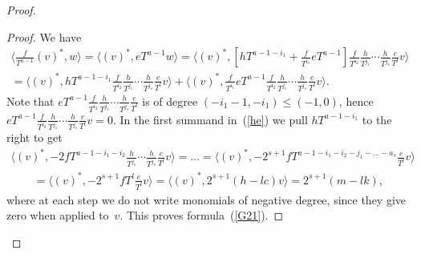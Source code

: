 \documentclass[pdftex]{sigma}
\numberwithin{equation}{section}
\begin{document}
\begin{proof}
\begin{proof}We have
\begin{gather}
\bigg\langle \frac{f}{T^{a-1}} (v)^*, w \bigg\rangle = \big\langle (v)^*, eT^{a-1} w \big\rangle = \bigg\langle (v)^*, \left[ hT^{a-1-i_1} +
\frac{f}{T^{i_1}} eT^{a-1} \right]
 \frac{f}{T^{i_2}}\frac{h}{T^{j_1}} \cdots \frac{h}{T^{j_s}} \frac{e}{T^l}v \bigg\rangle \nonumber \\
{}= \bigg\langle (v)^*, hT^{a-1-i_1}
\frac{f}{T^{i_2}}\frac{h}{T^{j_1}} \cdots \frac{h}{T^{j_s}} \frac{e}{T^l}v \bigg\rangle +
\bigg\langle (v)^*, \frac{f}{T^{i_1}} eT^{a-1}
 \frac{f}{T^{i_2}}\frac{h}{T^{j_1}} \cdots \frac{h}{T^{j_s}} \frac{e}{T^l}v \bigg\rangle. \label{he}
\end{gather}
Note that $eT^{a-1} \frac{f}{T^{i_2}} \frac{h}{T^{j_1}} \cdots \frac{h}{T^{j_s}} \frac{e}{T^l}$ is of degree $(-i_1 - 1, -i_1) \leq (-1,0)$, hence \newline $eT^{a-1} \frac{f}{T^{i_2}} \frac{h}{T^{j_1}}\cdots\frac{h}{T^{j_s}} \frac{e}{T^{l}} v = 0$. In the first summand in~(\ref{he}) we pull $hT^{a-1-i_1}$ to the right to get
\begin{gather*}
\bigg\langle (v)^*, -2 fT^{a-1-i_1-i_2} \frac{h}{T^{j_1}} \cdots \frac{h}{T^{j_s}} \frac{e}{T^l}v \bigg\rangle = \dots = \bigg\langle (v)^*, -2^{s+1} fT^{a-1-i_1-i_2-j_1-\dots -a_s} \frac{e}{T^l}v \bigg\rangle \\
\qquad{} = \bigg\langle (v)^*, -2^{s+1} fT^{l} \frac{e}{T^l}v \bigg\rangle = \big\langle (v)^*, 2^{s+1} (h - lc) v \big\rangle = 2^{s+1} (m - lk),
\end{gather*}
where at each step we do not write monomials of negative degree, since they give zero when applied to~$v$. This proves formula~(\ref{G21}).


\end{proof}
\end{proof}
\end{document}

